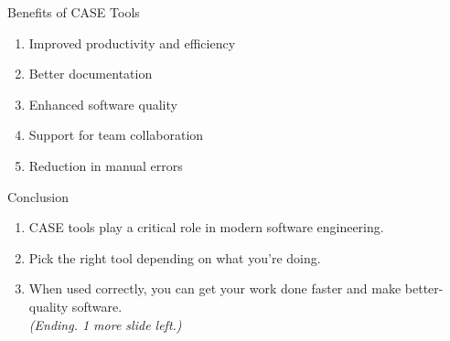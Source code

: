 \documentclass[14pt, aspectratio=169]{beamer}
\begin{document}
\begin{frame}{Benefits of CASE Tools}
	\begin{enumerate}
		\item<1-> Improved productivity and efficiency \pause
		\item<2-> Better documentation \pause
		\item<3-> Enhanced software quality \pause
		\item<4-> Support for team collaboration \pause
		\item<5-> Reduction in manual errors
	\end{enumerate}
\end{frame}

\begin{frame}{Conclusion}
	\begin{enumerate}
		\item<1-> CASE tools play a critical role in modern software engineering. \pause
		\item<2-> Pick the right tool depending on what you're doing.
		\item<3-> When used correctly, you can get your work done faster and make better-quality software. \pause
			\vspace{2em} \\
			\textit{(Ending. 1 more slide left.)}
	\end{enumerate}
\end{frame}
\end{document}
